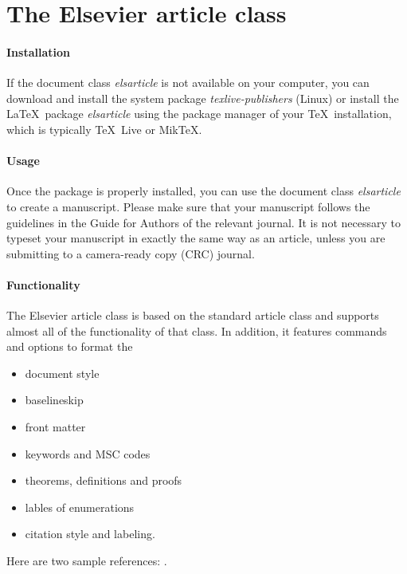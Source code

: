 \documentclass[preprint]{elsarticle}
\def\tightlist{}
\begin{document}
\begin{frontmatter}



\end{frontmatter}

\linenumbers

\hypertarget{the-elsevier-article-class}{%
\section{The Elsevier article class}\label{the-elsevier-article-class}}

\paragraph{Installation}

If the document class \emph{elsarticle} is not available on your
computer, you can download and install the system package
\emph{texlive-publishers} (Linux) or install the \LaTeX~package
\emph{elsarticle} using the package manager of your \TeX~installation,
which is typically \TeX~Live or Mik\TeX.

\paragraph{Usage}

Once the package is properly installed, you can use the document class
\emph{elsarticle} to create a manuscript. Please make sure that your
manuscript follows the guidelines in the Guide for Authors of the
relevant journal. It is not necessary to typeset your manuscript in
exactly the same way as an article, unless you are submitting to a
camera-ready copy (CRC) journal.

\paragraph{Functionality}

The Elsevier article class is based on the standard article class and
supports almost all of the functionality of that class. In addition, it
features commands and options to format the

\begin{itemize}
\tightlist
\item
  document style
\item
  baselineskip
\item
  front matter
\item
  keywords and MSC codes
\item
  theorems, definitions and proofs
\item
  lables of enumerations
\item
  citation style and labeling.
\end{itemize}

Here are two sample references: \cite{Feynman1963118,Dirac1953888}.


\end{document}

